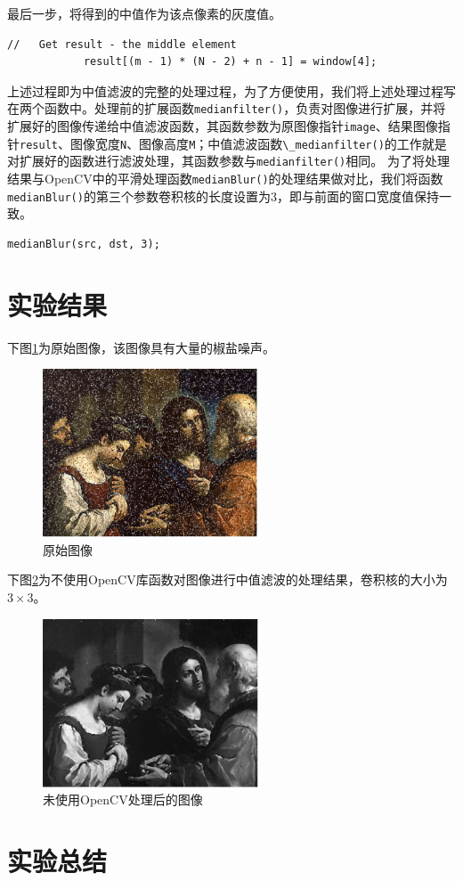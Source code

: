 \documentclass[a4paper]{ctexrep}
\begin{document}
最后一步，将得到的中值作为该点像素的灰度值。

\begin{lstlisting}
//   Get result - the middle element
			result[(m - 1) * (N - 2) + n - 1] = window[4];
\end{lstlisting}

上述过程即为中值滤波的完整的处理过程，为了方便使用，我们将上述处理过程写在两个函数中。处理前的扩展函数\lstinline{medianfilter()}，负责对图像进行扩展，并将扩展好的图像传递给中值滤波函数，其函数参数为原图像指针\lstinline{image}、结果图像指针\lstinline{result}、图像宽度\lstinline{N}、图像高度\lstinline{M}；中值滤波函数\lstinline{\_medianfilter()}的工作就是对扩展好的函数进行滤波处理，其函数参数与\lstinline{medianfilter()}相同。
为了将处理结果与OpenCV中的平滑处理函数\lstinline{medianBlur()}的处理结果做对比，我们将函数\lstinline{medianBlur()}的第三个参数卷积核的长度设置为3，即与前面的窗口宽度值保持一致。

\begin{lstlisting}
medianBlur(src, dst, 3);
\end{lstlisting}

\section{实验结果}

下图\ref {fig:previous}为原始图像，该图像具有大量的椒盐噪声。

\begin{figure}[h]
\centering
\includegraphics[height=5cm]{img/impulseNoise.pdf}
\caption{原始图像}
\label {fig:previous}
\end{figure}

下图\ref {fig:firtProc}为不使用OpenCV库函数对图像进行中值滤波的处理结果，卷积核的大小为$3\times3$。

\begin{figure}[h]
\centering
\includegraphics[height=5cm]{img/processedImage1.pdf}
\caption{未使用OpenCV处理后的图像}
\label{fig:firtProc}
\end{figure}


\section{实验总结}
\end{document}
